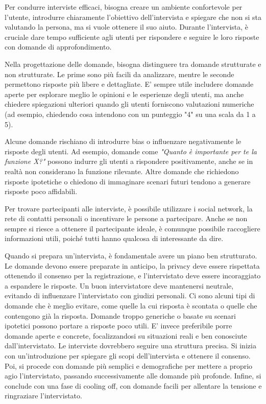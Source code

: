 Per condurre interviste efficaci, bisogna creare un ambiente confortevole per l’utente, introdurre chiaramente l'obiettivo dell’intervista e spiegare che non si sta valutando la persona, ma si vuole ottenere il suo aiuto. Durante l'intervista, è cruciale dare tempo sufficiente agli utenti per rispondere e seguire le loro risposte con domande di approfondimento.

Nella progettazione delle domande, bisogna distinguere tra domande strutturate e non strutturate. Le prime sono più facili da analizzare, mentre le seconde permettono risposte più libere e dettagliate. E' sempre utile includere domande aperte per esplorare meglio le opinioni e le esperienze degli utenti, ma anche chiedere spiegazioni ulteriori quando gli utenti forniscono valutazioni numeriche (ad esempio, chiedendo cosa intendono con un punteggio "4" su una scala da 1 a 5).

Alcune domande rischiano di introdurre bias o influenzare negativamente le risposte degli utenti. Ad esempio, domande come \textit{"Quanto è importante per te la funzione X?"} possono indurre gli utenti a rispondere positivamente, anche se in realtà non considerano la funzione rilevante. Altre domande che richiedono risposte ipotetiche o chiedono di immaginare scenari futuri tendono a generare risposte poco affidabili.

Per trovare partecipanti alle interviste, è possibile utilizzare i social network, la rete di contatti personali o incentivare le persone a partecipare. Anche se non sempre si riesce a ottenere il partecipante ideale, è comunque possibile raccogliere informazioni utili, poiché tutti hanno qualcosa di interessante da dire.

Quando si prepara un’intervista, è fondamentale avere un piano ben strutturato. Le domande devono essere preparate in anticipo, la privacy deve essere rispettata ottenendo il consenso per la registrazione, e l'intervistato deve essere incoraggiato a espandere le risposte. Un buon intervistatore deve mantenersi neutrale, evitando di influenzare l’intervistato con giudizi personali.
Ci sono alcuni tipi di domande che è meglio evitare, come quelle la cui risposta è scontata o quelle che contengono già la risposta. Domande troppo generiche o basate su scenari ipotetici possono portare a risposte poco utili. E' invece preferibile porre domande aperte e concrete, focalizzandosi su situazioni reali e ben conosciute dall’intervistato.
Le interviste dovrebbero seguire una struttura precisa. Si inizia con un’introduzione per spiegare gli scopi dell’intervista e ottenere il consenso. Poi, si procede con domande più semplici e demografiche per mettere a proprio agio l’intervistato, passando successivamente alle domande più profonde. Infine, si conclude con una fase di cooling off, con domande facili per allentare la tensione e ringraziare l’intervistato.

